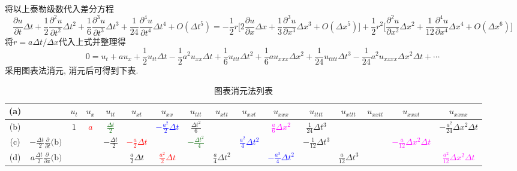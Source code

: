 \begin{landscape}
\begin{solution}
\noindent 将以上泰勒级数代入差分方程
\[
\frac{\partial u}{\partial t}\Delta t+\frac{1}{2}\frac{\partial^{2}u}{\partial t^{2}}\Delta t^{2}+\frac{1}{6}\frac{\partial^{3}u}{\partial t^{3}}\Delta t^{3}+\frac{1}{24}\frac{\partial^{4}u}{\partial t^{4}}\Delta t^{4}+O(\Delta t^{5})=-\frac{1}{2}r\Big[2\frac{\partial u}{\partial x}\Delta x+\frac{1}{3}\frac{\partial^{3}u}{\partial x^{3}}\Delta x^{3}+O(\Delta x^{5})\Big]+\frac{1}{2}r^{2}\Big[\frac{\partial^{2}u}{\partial x^{2}}\Delta x^{2}+\frac{1}{12}\frac{\partial^{4}u}{\partial x^{4}}\Delta x^{4}+O(\Delta x^{6})\Big]
\]
将$r=a\Delta t/\Delta x$代入上式并整理得
\[
0=u_{t}+au_{x}+\frac{1}{2}u_{tt}\Delta t-\frac{1}{2}a^{2}u_{xx}\Delta t+\frac{1}{6}u_{ttt}\Delta t^{2}+\frac{1}{6}au_{xxx}\Delta x^{2}+\frac{1}{24}u_{tttt}\Delta t^{3}-\frac{1}{24}a^{2}u_{xxxx}\Delta x^{2}\Delta t+\cdots
\]
采用图表法消元, 消元后可得到下表.
\begin{table}[!htb]
\centering
\caption{\label{tab:08}图表消元法列表}
\renewcommand\arraystretch{1.9}
{\scriptsize
\begin{tabular}{|c|r|c|c|c|c|c|c|c|c|c|c|c|c|c|c|}
\hline
(a) &  & $u_{t}$ & $u_{x}$ & $u_{tt}$ & $u_{xt}$ & $u_{xx}$ & $u_{ttt}$ & $u_{xtt}$ & $u_{xxt}$ & $u_{xxx}$ & $u_{tttt}$ & $u_{xttt}$ & $u_{xxtt}$ & $u_{xxxt}$ & $u_{xxxx}$\tabularnewline
\hline
\hline
(b) &  & \textcolor{black}{$1$} & \textcolor{red}{$a$} & \textcolor{DarkGreen}{$\frac{\Delta t}{2}$} &  & \textcolor{blue}{$-\frac{a^{2}}{2}\Delta t$} & \textcolor[rgb]{0.6,0.3,0.1}{$\frac{\Delta t^{2}}{6}$} &  &  & \textcolor{magenta}{$\frac{a}{6}\Delta x^{2}$} & \textcolor[rgb]{0.33,0.33,0.33}{$\frac{1}{24}\Delta t^{3}$} &  &  &  & \textcolor[rgb]{0.33,0.33,0.33}{$-\frac{a^{2}}{24}\Delta x^{2}\Delta t$}\tabularnewline
\hline
(c) & $-\frac{\Delta t}{2}\frac{\partial}{\partial t}\text{(b)}$ &  &  & \textcolor{black}{$-\frac{\Delta t}{2}$} & \textcolor{red}{$-\frac{a}{2}\Delta t$} &  & \textcolor{DarkGreen}{$-\frac{\Delta t^{2}}{4}$} &  & \textcolor{blue}{$\frac{a^{2}}{4}\Delta t^{2}$} &  & \textcolor[rgb]{0.6,0.3,0.1}{$-\frac{1}{12}\Delta t^{3}$} &  &  & \textcolor{magenta}{$-\frac{a}{12}\Delta x^{2}\Delta t$} & \tabularnewline
\hline
(d) & $a\frac{\Delta t}{2}\frac{\partial}{\partial x}\text{(b)}$ &  &  &  & \textcolor{black}{$\frac{a}{2}\Delta t$} & \textcolor{red}{$\frac{a^{2}}{2}\Delta t$} &  & $\frac{a}{4}\Delta t^{2}$ &  & \textcolor{blue}{$-\frac{a^{3}}{4}\Delta t^{2}$} &  & \textcolor[rgb]{0.6,0.3,0.1}{$\frac{a}{12}\Delta t^{3}$} &  &  & \textcolor{magenta}{$\frac{a^{2}}{12}\Delta x^{2}\Delta t$}\tabularnewline

\end{tabular}}
\end{table}
\end{solution}
\end{landscape}

